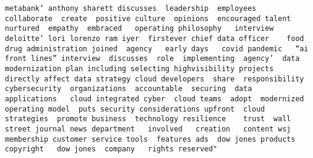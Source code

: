 \documentclass[
]{article}
\begin{document}
\begin{verbatim}
metabank’ anthony sharett discusses  leadership  employees  collaborate  create  positive culture  opinions  encouraged talent  nurtured  empathy  embraced   operating philosophy   interview  deloitte’ lori lorenzo ram iyer  firstever chief data officer    food  drug administration joined  agency   early days   covid pandemic   “ai   front lines” interview  discusses  role  implementing  agency’  data modernization plan including selecting highvisibility projects  directly affect data strategy cloud developers  share  responsibility  cybersecurity  organizations  accountable  securing  data  applications   cloud integrated cyber  cloud teams  adopt  modernized operating model  puts security considerations upfront  cloud strategies  promote business  technology resilience    trust  wall street journal news department   involved   creation   content wsj membership customer service tools  features ads  dow jones products copyright   dow jones  company   rights reserved"                                                                                                                                                                                                                                                                                                                                                                                                                                                                                                                                                                                                                                                                                                                                                                                                                                                                                                                                                                                                                                                                                                                                                                                                                                                                                                                                                                                                                                                                                                                                                                                                                                                                                                                                                                                                                                                                                                                                                                                                                                                                                                                                                                                                                                                                                                                                                                                                                                  
\end{verbatim}
\end{document}
